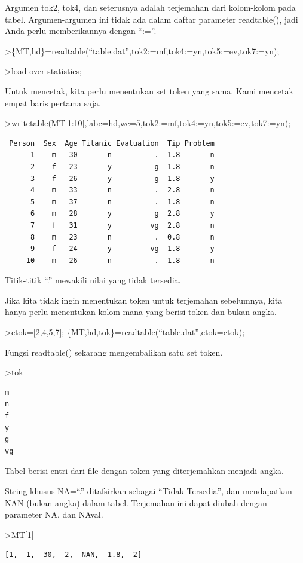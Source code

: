 \documentclass[
]{book}
\begin{document}
Argumen tok2, tok4, dan seterusnya adalah terjemahan dari kolom-kolom pada tabel. Argumen-argumen ini tidak ada dalam daftar parameter readtable(), jadi Anda perlu memberikannya dengan ``:=''.

\textgreater\{MT,hd\}=readtable(``table.dat'',tok2:=mf,tok4:=yn,tok5:=ev,tok7:=yn);

\textgreater load over statistics;

Untuk mencetak, kita perlu menentukan set token yang sama. Kami mencetak empat baris pertama saja.

\textgreater writetable(MT{[}1:10{]},labc=hd,wc=5,tok2:=mf,tok4:=yn,tok5:=ev,tok7:=yn);

\begin{verbatim}
 Person  Sex  Age Titanic Evaluation  Tip Problem
      1    m   30       n          .  1.8       n
      2    f   23       y          g  1.8       n
      3    f   26       y          g  1.8       y
      4    m   33       n          .  2.8       n
      5    m   37       n          .  1.8       n
      6    m   28       y          g  2.8       y
      7    f   31       y         vg  2.8       n
      8    m   23       n          .  0.8       n
      9    f   24       y         vg  1.8       y
     10    m   26       n          .  1.8       n
\end{verbatim}

Titik-titik ``.'' mewakili nilai yang tidak tersedia.

Jika kita tidak ingin menentukan token untuk terjemahan sebelumnya, kita hanya perlu menentukan kolom mana yang berisi token dan bukan angka.

\textgreater ctok={[}2,4,5,7{]}; \{MT,hd,tok\}=readtable(``table.dat'',ctok=ctok);

Fungsi readtable() sekarang mengembalikan satu set token.

\textgreater tok

\begin{verbatim}
m
n
f
y
g
vg
\end{verbatim}

Tabel berisi entri dari file dengan token yang diterjemahkan menjadi angka.

String khusus NA=``.'' ditafsirkan sebagai ``Tidak Tersedia'', dan mendapatkan NAN (bukan angka) dalam tabel. Terjemahan ini dapat diubah dengan parameter NA, dan NAval.

\textgreater MT{[}1{]}

\begin{verbatim}
[1,  1,  30,  2,  NAN,  1.8,  2]
\end{verbatim}
\end{document}
